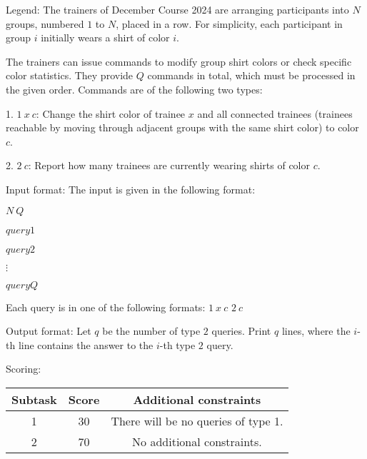 Legend:  
The trainers of December Course 2024 are arranging participants into $N$ groups, numbered $1$ to $N$, placed in a row. For simplicity, each participant in group $i$ initially wears a shirt of color $i$.  

The trainers can issue commands to modify group shirt colors or check specific color statistics. They provide $Q$ commands in total, which must be processed in the given order. Commands are of the following two types:  

1. $1\ x\ c$: Change the shirt color of trainee $x$ and all connected trainees (trainees reachable by moving through adjacent groups with the same shirt color) to color $c$.  

2. $2\ c$: Report how many trainees are currently wearing shirts of color $c$.  

Input format:  
The input is given in the following format:  

$N\ Q$  

$query1$  

$query2$  

$\vdots$  

$queryQ$  

Each query is in one of the following formats:  
$1\ x\ c$  
$2\ c$  

Output format:  
Let $q$ be the number of type $2$ queries. Print $q$ lines, where the $i$-th line contains the answer to the $i$-th type $2$ query.  

Scoring:
\begin{table}[h!]
    \begin{center}
        \begin{tabular}{|c|c|c|} 
            \hline
            \textbf{Subtask} & \textbf{Score} & \textbf{Additional constraints} \\
            \hline
            1 & 30 & There will be no queries of type 1. \\
            \hline
            2 & 70 & No additional constraints. \\
            \hline
        \end{tabular}
    \end{center}
\end{table}